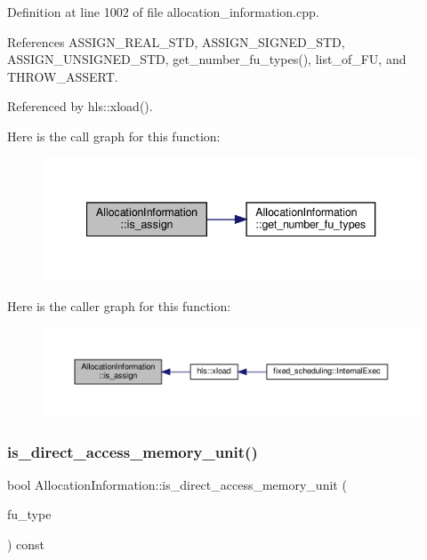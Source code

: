 Definition at line 1002 of file allocation\+\_\+information.\+cpp.



References A\+S\+S\+I\+G\+N\+\_\+\+R\+E\+A\+L\+\_\+\+S\+TD, A\+S\+S\+I\+G\+N\+\_\+\+S\+I\+G\+N\+E\+D\+\_\+\+S\+TD, A\+S\+S\+I\+G\+N\+\_\+\+U\+N\+S\+I\+G\+N\+E\+D\+\_\+\+S\+TD, get\+\_\+number\+\_\+fu\+\_\+types(), list\+\_\+of\+\_\+\+FU, and T\+H\+R\+O\+W\+\_\+\+A\+S\+S\+E\+RT.



Referenced by hls\+::xload().

Here is the call graph for this function\+:
\nopagebreak
\begin{figure}[H]
\begin{center}
\leavevmode
\includegraphics[width=340pt]{d7/d79/classAllocationInformation_a2989fe891888c7cbf2827061e22143dc_cgraph}
\end{center}
\end{figure}
Here is the caller graph for this function\+:
\nopagebreak
\begin{figure}[H]
\begin{center}
\leavevmode
\includegraphics[width=350pt]{d7/d79/classAllocationInformation_a2989fe891888c7cbf2827061e22143dc_icgraph}
\end{center}
\end{figure}
\mbox{\label{classAllocationInformation_a1950658762d7b1febe0131924202ae36}} 
\subsubsection{\texorpdfstring{is\+\_\+direct\+\_\+access\+\_\+memory\+\_\+unit()}{is\_direct\_access\_memory\_unit()}}
{\footnotesize\ttfamily bool Allocation\+Information\+::is\+\_\+direct\+\_\+access\+\_\+memory\+\_\+unit (\begin{DoxyParamCaption}\item[{unsigned int}]{fu\+\_\+type }\end{DoxyParamCaption}) const}



